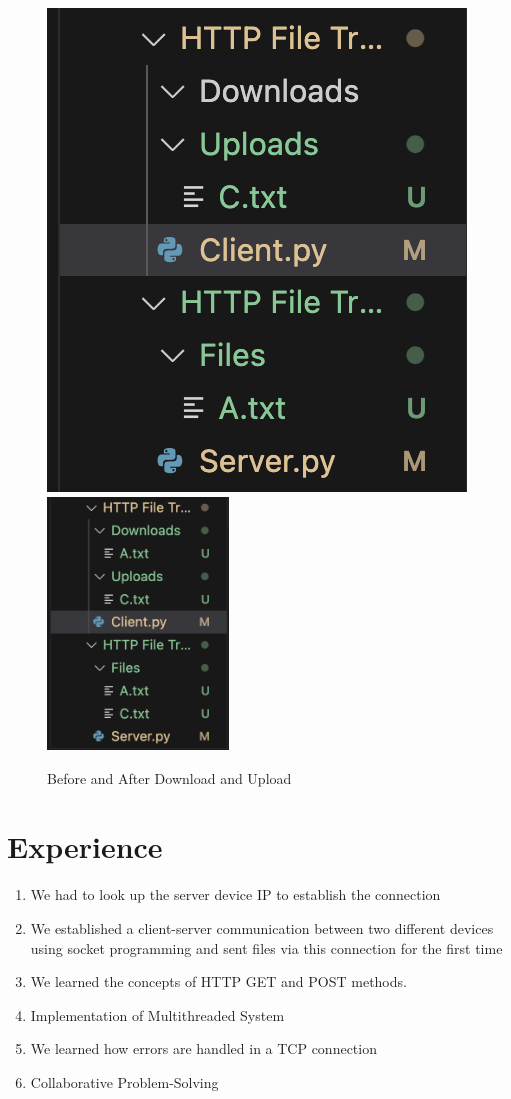 \documentclass[11pt]{article}
\begin{document}
    \begin{figure}[h]
    \centering
    \includegraphics[height=0.6\textwidth]{after.png}
    \includegraphics[width=0.43\textwidth]{before.png}
    \caption{Before and After Download and Upload}
    \label{fig:before_after}
\end{figure}

\newpage
\section{Experience}
\begin{enumerate}
    \item We had to look up the server device IP to establish the connection
    \item We established a client-server communication between two different devices using socket programming and sent files via this connection for the first time
    \item We learned the concepts of HTTP GET and POST methods.
    \item Implementation of Multithreaded  System
    \item We learned how errors are handled in a TCP connection
    \item Collaborative Problem-Solving

\end{enumerate}
\end{document}
